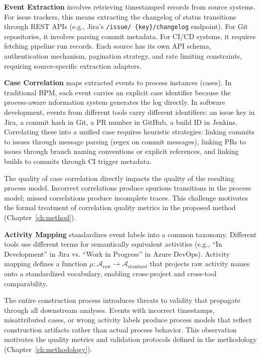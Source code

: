 \textbf{Event Extraction} involves retrieving timestamped records from
source systems. For issue trackers, this means extracting the changelog
of status transitions through REST APIs (e.g., Jira's \texttt{/issue/
\{key\}/changelog} endpoint). For Git repositories, it involves parsing
commit metadata. For CI/CD systems, it requires fetching pipeline run
records. Each source has its own API schema, authentication mechanism,
pagination strategy, and rate limiting constraints, requiring
source-specific extraction adapters.

\textbf{Case Correlation} maps extracted events to process instances
(cases). In traditional BPM, each event carries an explicit case
identifier because the process-aware information system generates the
log directly. In software development, events from different tools carry
different identifiers: an issue key in Jira, a commit hash in Git, a
PR number in GitHub, a build ID in Jenkins. Correlating these into a
unified case requires heuristic strategies: linking commits to issues
through message parsing (regex on commit messages), linking PRs to
issues through branch naming conventions or explicit references, and
linking builds to commits through CI trigger metadata.

The quality of case correlation directly impacts the quality of the
resulting process model. Incorrect correlations produce spurious
transitions in the process model; missed correlations produce incomplete
traces. This challenge motivates the formal treatment of correlation
quality metrics in the proposed method (Chapter~\ref{ch:method}).

\textbf{Activity Mapping} standardizes event labels into a common
taxonomy. Different tools use different terms for semantically equivalent
activities (e.g., ``In Development'' in Jira vs. ``Work in Progress'' in
Azure DevOps). Activity mapping defines a function
$\mu: \mathcal{A}_{\text{raw}} \rightarrow \mathcal{A}_{\text{standard}}$
that projects raw activity names onto a standardized vocabulary,
enabling cross-project and cross-tool comparability.

The entire construction process introduces threats to validity that
propagate through all downstream analyses. Events with incorrect
timestamps, misattributed cases, or wrong activity labels produce
process models that reflect construction artifacts rather than actual
process behavior. This observation motivates the quality metrics and
validation protocols defined in the methodology
(Chapter~\ref{ch:methodology}).


